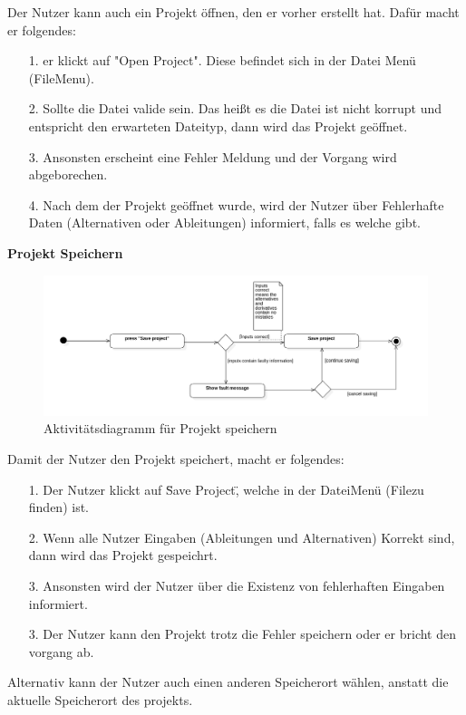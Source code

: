 \documentclass{article}
\begin{document}
Der Nutzer kann auch ein Projekt öffnen, den er vorher erstellt hat. Dafür macht er folgendes:
\begin{enumerate}
    \item[1.] er klickt auf "Open Project". Diese befindet sich in der Datei Menü (FileMenu).
    \item[2.] Sollte die Datei valide sein. Das heißt es die Datei ist nicht korrupt und entspricht den erwarteten Dateityp, dann wird das Projekt geöffnet.
    \item[3.] Ansonsten erscheint eine Fehler Meldung und der Vorgang wird abgeborechen.
    \item[4.] Nach dem der Projekt geöffnet wurde, wird der Nutzer über Fehlerhafte Daten (Alternativen oder Ableitungen) informiert, falls es welche gibt. 
\end{enumerate}

\textbf{\large{Projekt Speichern}}
\begin{figure}[H]%
    \centering
    \includegraphics[width=13cm]{entwurf/Entwurf_dokument/img/Alissa/SaveProjectAD.png}
    \caption{Aktivitätsdiagramm für Projekt speichern}
\end{figure}
Damit der Nutzer den Projekt speichert, macht er folgendes:
\begin{enumerate}
    \item[1.] Der Nutzer klickt auf \"Save Project\", welche in der Datei\textendash Menü (File\textendash zu finden) ist.
    \item[2.] Wenn alle Nutzer Eingaben (Ableitungen und Alternativen) Korrekt sind, dann wird das Projekt gespeichrt.
    \item[3.] Ansonsten wird der Nutzer über die Existenz von fehlerhaften Eingaben informiert.
    \item[3.] Der Nutzer kann den Projekt trotz die Fehler speichern oder er bricht den vorgang ab.
\end{enumerate}
Alternativ kann der Nutzer auch einen anderen Speicherort wählen, anstatt die aktuelle Speicherort des projekts.
\end{document}
